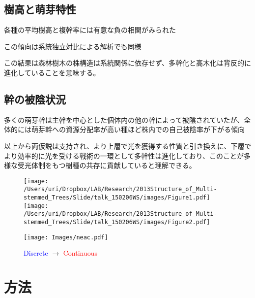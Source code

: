 \documentclass[a0, 36pt, plainboxedsections]{sciposter} %
\begin{document}
\subsection*{樹高と萌芽特性}

\begin{list}{}{\setlength{\itemindent}{1em}}
  \item 各種の平均樹高と複幹率には有意な負の相関がみられた
  \item この傾向は系統独立対比による解析でも同様
\end{list}

この結果は森林樹木の株構造は系統関係に依存せず、多幹化と高木化は背反的に進化していることを意味する。


\subsection*{幹の被陰状況}

多くの萌芽幹は主幹を中心とした個体内の他の幹によって被陰されていたが、全体的には萌芽幹への資源分配率が高い種ほど株内での自己被陰率が下がる傾向

以上から両仮説は支持され、より上層で光を獲得する性質と引き換えに、下層でより効率的に光を受ける戦術の一環として多幹性は進化しており、このことが多様な受光体制をもつ樹種の共存に貢献していると理解できる。

\begin{figure}
	\begin{center}
		\texttt{[image: /Users/uri/Dropbox/LAB/Research/2013Structure\_of\_Multi-stemmed\_Trees/Slide/talk\_150206WS/images/Figure1.pdf]}
		\texttt{[image: /Users/uri/Dropbox/LAB/Research/2013Structure\_of\_Multi-stemmed\_Trees/Slide/talk\_150206WS/images/Figure2.pdf]}
	\end{center}
\end{figure}

\begin{figure}[H]
  \begin{center}
	\texttt{[image: Images/neac.pdf]}
	{\small\caption{{\textcolor{blue}{Discrete}} $\rightarrow$ {\textcolor{red}{Continuous}}}}
  \end{center}
\end{figure}

\section*{\huge{方法}}
\end{document}
